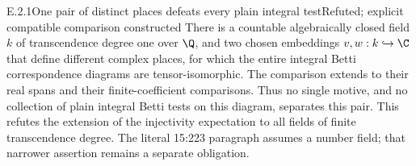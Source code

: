 \begin{result}{E.2.1}{One pair of distinct places defeats every plain integral test}{Refuted; explicit compatible comparison constructed}
There is a countable algebraically closed field $k$ of transcendence degree one over $\Q$, and two chosen embeddings $v,w:k\hookrightarrow\C$ that define different complex places, for which the entire integral Betti correspondence diagrams are tensor-isomorphic. The comparison extends to their real spans and their finite-coefficient comparisons. Thus no single motive, and no collection of plain integral Betti tests on this diagram, separates this pair. This refutes the extension of the injectivity expectation to all fields of finite transcendence degree. The literal 15:223 paragraph assumes a number field; that narrower assertion remains a separate obligation.
\end{result}
